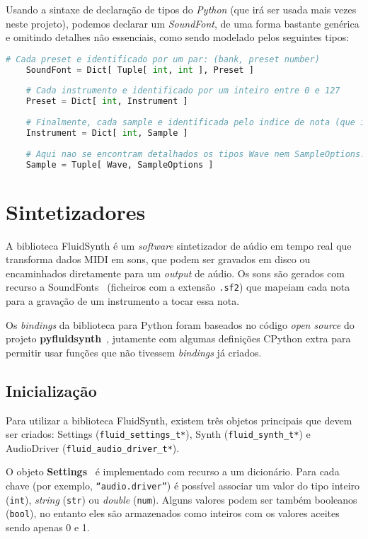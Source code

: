 Usando a sintaxe de declaração de tipos do \textit{Python} (que irá ser usada mais vezes neste projeto), podemos declarar um \textit{SoundFont}, de uma forma bastante genérica e omitindo detalhes não essenciais, como sendo modelado pelos seguintes tipos:
\newpage
\begin{lstlisting}[caption=Sistema de Tipos de um ficheiro SoundFont,captionpos=b,language=Python]
    # Cada preset e identificado por um par: (bank, preset number)
    SoundFont = Dict[ Tuple[ int, int ], Preset ]
    
    # Cada instrumento e identificado por um inteiro entre 0 e 127
    Preset = Dict[ int, Instrument ]
    
    # Finalmente, cada sample e identificada pelo indice de nota (que iremos abordar mais a frente em detalhe, no capitulo sobre sintetizadores)
    Instrument = Dict[ int, Sample ]
    
    # Aqui nao se encontram detalhados os tipos Wave nem SampleOptions.
    Sample = Tuple[ Wave, SampleOptions ]
\end{lstlisting}


\section{Sintetizadores}
A biblioteca FluidSynth é um \textit{software} sintetizador de aúdio em tempo real que transforma dados MIDI em sons, que podem ser gravados em disco ou encaminhados diretamente para um \textit{output} de aúdio. Os sons são gerados com recurso a SoundFonts~\cite{soundfont} (ficheiros com a extensão \texttt{.sf2}) que mapeiam cada nota para a gravação de um instrumento a tocar essa nota.

Os \textit{bindings} da biblioteca para Python foram baseados no código \textit{open source} do projeto \textbf{pyfluidsynth}~\cite{pyfluidsynth}, jutamente com algumas definições CPython extra para permitir usar funções que não tivessem \textit{bindings} já criados.

\subsection{Inicialização}
Para utilizar a biblioteca FluidSynth, existem três objetos principais que devem ser criados: Settings (\texttt{fluid\_settings\_t*}), Synth (\texttt{fluid\_synth\_t*}) e AudioDriver (\texttt{fluid\_audio\_driver\_t*}).

O objeto \textbf{Settings}~\cite{fluidsynth_settings} é implementado com recurso a um dicionário. Para cada chave (por exemplo, \texttt{``audio.driver''}) é possível associar um valor do tipo inteiro (\texttt{int}), \textit{string} (\texttt{str}) ou \textit{double} (\texttt{num}). Alguns valores podem ser também booleanos (\texttt{bool}), no entanto eles são armazenados como inteiros com os valores aceites sendo apenas 0 e 1.

